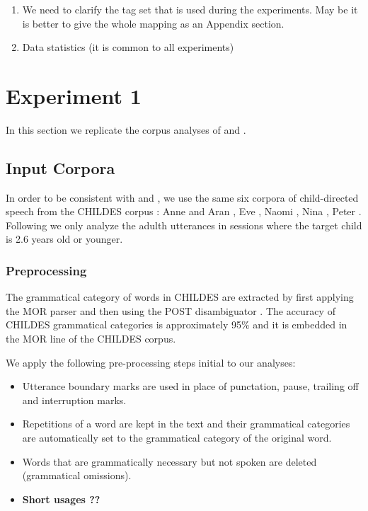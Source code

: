 \begin{enumerate}
\item We need to clarify the tag set that is used during the
  experiments. May be it is better to give the whole mapping as an
  Appendix section.
\item Data statistics (it is common to all experiments)
\end{enumerate}
\section{Experiment 1}
In this section we replicate the corpus analyses of \cite{20674613}
and \cite{Mintz200391}.  

\subsection{Input Corpora}

In order to be consistent with \cite{20674613} and \cite{Mintz200391},
we use the same six corpora of child-directed speech from the CHILDES
corpus \citep*{macwhinney2000childes}: Anne and Aran
\citep*{theakston2001role}, Eve \citep*{JCL:1765112}, Naomi
\citep*{sachs1983talking}, Nina \citep*{suppes1974semantics}, Peter
\citep*{Bloom1974380, bloom1975structure}.  Following
\cite{Mintz200391} we only analyze the adulth utterances in sessions
where the target child is 2.6 years old or younger.

\subsubsection{Preprocessing}

The grammatical category of words in CHILDES are extracted by first
applying the MOR parser \citep*{macwhinney2000childes} and then using
the POST disambiguator \citep*{sagae2004automatic}.  The accuracy of
CHILDES grammatical categories is approximately 95\%
\citep*{parisse2000automatic} and it is embedded in the MOR line of
the CHILDES corpus.

We apply the following pre-processing steps \citep*{20674613} initial
to our analyses:
\begin{itemize}
\item Utterance boundary marks are used in place of punctation, pause,
  trailing off and interruption marks.
\item Repetitions of a word are kept in the text and their grammatical
  categories are automatically set to the grammatical category of the
  original word.
\item Words that are grammatically necessary but not spoken are
  deleted (grammatical omissions).
\item {\bf Short usages ??}

\end{itemize}


